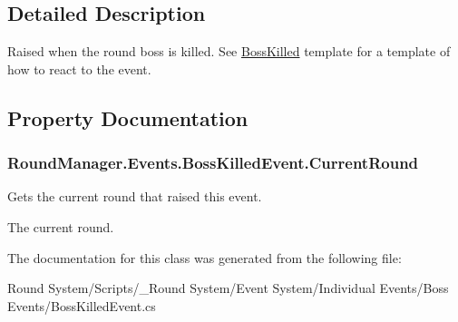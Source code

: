 \subsection{Detailed Description}
Raised when the round boss is killed. See \hyperlink{class_round_manager_1_1_boss_killed}{Boss\+Killed} template for a template of how to react to the event. 



\subsection{Property Documentation}
\hypertarget{class_round_manager_1_1_events_1_1_boss_killed_event_a3e2a14ff61eceb7c3b1d9ffc8c0867c6}{}
\subsubsection[{Current\+Round}]{ Round\+Manager.\+Events.\+Boss\+Killed\+Event.\+Current\+Round\hspace{0.3cm}{\ttfamily [get]}}\label{class_round_manager_1_1_events_1_1_boss_killed_event_a3e2a14ff61eceb7c3b1d9ffc8c0867c6}


Gets the current round that raised this event. 

The current round.

The documentation for this class was generated from the following file\+:\begin{DoxyCompactItemize}
\item 
Round System/\+Scripts/\+\_\+\+Round System/\+Event System/\+Individual Events/\+Boss Events/Boss\+Killed\+Event.\+cs\end{DoxyCompactItemize}
